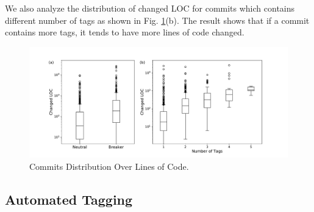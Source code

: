 We also analyze the distribution of changed LOC for commits which contains different number of tags as shown in Fig. \ref{fig: commit_LOC}(b).
The result shows that if a commit contains more tags, it tends to have more lines of code changed. 
\begin{figure}[htbp]
\centerline{\includegraphics[scale=0.5]{figures/commit_size.pdf}}
\caption{Commits Distribution Over Lines of Code.}
\label{fig: commit_LOC}
\end{figure}

\subsection{Automated Tagging}
